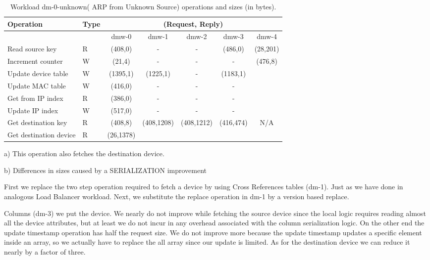 \begin{table}[ht]
\small
\centering 
\begin{threeparttable}
\begin{tabular}{ll ccccc}
 Operation & Type &  \multicolumn{5}{c}{ (Request, Reply) } \\  \midrule
&  & dmw-0 & dmw-1  & dmw-2 & dmw-3 & dmw-4 \\ \toprule 
Read source key & R & (408,0) & - & - & (486,0) & (28,201)\tnote{a}\\
Increment counter & W & (21,4) & -  & - & - & \multirow{5}{*}{(476,8)} \\
Update device table & W & (1395,1) & (1225,1)\tnote{b}  & - &
(1183,1) & \\
Update MAC  table & W & (416,0) & - & - & -
& \\
Get from IP index & R & (386,0) & - & - & - & \\
Update IP index  & W & (517,0) & - & - & - & \\
Get destination key & R & (408,8) &
\multirow{2}{*}{(408,1208)}\tnote{b} & \multirow{2}{*}{(408,1212)} &
\multirow{2}{*}{(416,474)} & \multirow{2}{*}{N/A}  \\ 
Get destination device & R & (26,1378)  &  & & \\\bottomrule
\end{tabular}
\caption[Workload dm-0-unknown( ARP from Unknown Source)
operations]{Workload dm-0-unknown( ARP from Unknown Source) operations
  and sizes (in bytes).}
\begin{tablenotes}
\item [a)] This operation also fetches the destination device.
\item [b)] Differences in sizes caused by a SERIALIZATION improvement 
\end{tablenotes}
\end{threeparttable}
\end{table}


First we  replace the two step operation required to fetch a device by
using Cross References tables (dm-1). Just as we have done in
analogous Load Balancer workload.  Next, we substitute the replace
operation in dm-1 by a version based replace. 

Columns (dm-3) we put the device. We  nearly do not improve  while
fetching the source device since the local logic requires reading
almost all the device attributes, but at least we do not incur in any
overhead associated with the column serialization logic. On the other
end the update timestamp operation has half the request size. We do
not improve more because the update timestamp updates a specific
element inside an array, so we actually have to replace the all array
since our update is limited. As for the destination device we can
reduce it nearly by a factor of three. 

